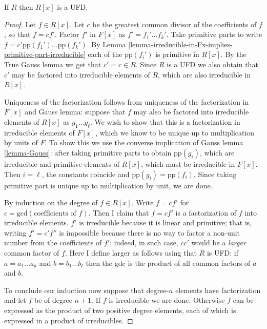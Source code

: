 \begin{lemma}
\label{lemma-Gauss-lemma-corollary}
If $R$ then $R[x]$ is a UFD.
\end{lemma}

\begin{proof}
Let $f\in R[x]$. Let $c$ be the greatest common divisor of the coefficients of
$f$, so that $f=cf'$. Factor $f'$ in $F[x]$ as $f'=f_1'\ldots f_k'$. Take
primitive parts to write $f=c'\text{pp}(f_1')\ldots \text{pp}(f_k')$. By Lemma
\ref{lemma-irreducible-in-Fx-implies-primitive-part-irreducible} each of the
$\text{pp}(f_i')$ is primitive in $R[x]$. By the True Gauss lemma we get that
$c'=c\in R$. Since $R$ is a UFD we also obtain that
$c'$ may be factored into irreducible elements of $R$, which are also
irreducible in $R[x]$.

Uniqueness of the factorization follows from uniqueness of the factorization in
$F[x]$ and Gauss lemma: suppose that $f$ may also be factored into irreducible
elements of $R[x]$ as $g_1\ldots g_\ell$. We wish to show that this is a
factorization in irreducible elements of $F[x]$, which we know to be unique up
to multiplication by units of $F$. To show this we use the converse implication
of Gauss lemma \ref{lemma-Gauss}: after taking primitive parts to obtain
$\text{pp}(g_i)$, which are irreducible and primitive elements of $R[x]$, which
must be irreducible in $F[x]$. Then $i=\ell$, the constants coincide and
$\text{pp}(g_i)=\text{pp}(f_i)$. Since taking primitive part is unique up to
multiplication by unit, we are done.

By induction on the degree of $f \in R[x]$. Write $f=cf'$ for
$c=\text{gcd}(\text{coefficients of $f$})$. Then I claim that $f=cf'$ is a
factorization of $f$ into irreducible elements. $f'$ is irreducible because it
is linear and primitive; that is, writing $f'=c'f''$ is impossible because
there is no way to factor a non-unit number from the coefficients of $f'$;
indeed, in such case, $cc'$ would be a {\it larger} common factor of $f$. Here I
define larger as follows using that $R$ is UFD: if $a=a_1\ldots a_k$ and
$b=b_1\ldots b_\ell$ then the gdc is the product of all common factors of $a$
and $b$.

To conclude our induction now suppose that degree-$n$ elements have
factorization and let $f$ be of degree $n+1$. If $f$ is irreducible we are done.
Otherwise $f$ can be expressed as the product of two positive degree elements,
each of which is expressed in a product of irreducibles.
\end{proof}




